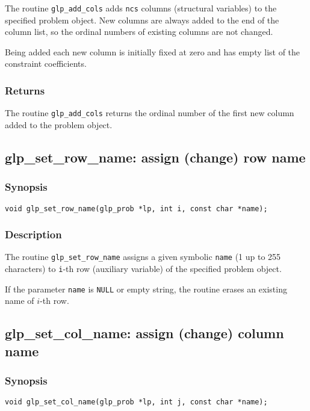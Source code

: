 The routine \verb|glp_add_cols| adds \verb|ncs| columns (structural
variables) to the specified problem object. New columns are always added
to the end of the column list, so the ordinal numbers of existing
columns are not changed.

Being added each new column is initially fixed at zero and has empty
list of the constraint coefficients.

\subsubsection*{Returns}

The routine \verb|glp_add_cols| returns the ordinal number of the first
new column added to the problem object.

\subsection{glp\_set\_row\_name: assign (change) row name}

\subsubsection*{Synopsis}

\begin{verbatim}
void glp_set_row_name(glp_prob *lp, int i, const char *name);
\end{verbatim}

\subsubsection*{Description}

The routine \verb|glp_set_row_name| assigns a given symbolic
\verb|name| (1 up to 255 characters) to \verb|i|-th row (auxiliary
variable) of the specified problem object.

If the parameter \verb|name| is \verb|NULL| or empty string, the routine
erases an existing name of $i$-th row.

\subsection{glp\_set\_col\_name: assign (change) column name}

\subsubsection*{Synopsis}

\begin{verbatim}
void glp_set_col_name(glp_prob *lp, int j, const char *name);
\end{verbatim}

